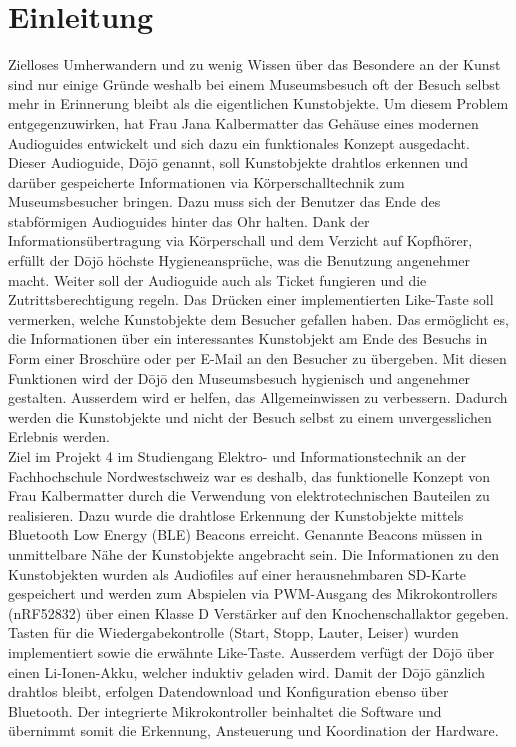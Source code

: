 \section{Einleitung}\label{sec:einleitung}
Zielloses Umherwandern und zu wenig Wissen über das Besondere an der Kunst sind nur einige Gründe weshalb bei einem Museumsbesuch oft der Besuch selbst mehr in Erinnerung bleibt als die eigentlichen Kunstobjekte. Um diesem Problem entgegenzuwirken, hat Frau Jana Kalbermatter das Gehäuse eines modernen Audioguides entwickelt und sich dazu ein funktionales Konzept ausgedacht. Dieser Audioguide, Dōjō genannt, soll Kunstobjekte drahtlos erkennen und darüber gespeicherte Informationen via Körperschalltechnik zum Museumsbesucher bringen. Dazu muss sich der Benutzer das Ende des stabförmigen Audioguides hinter das Ohr halten. Dank der Informationsübertragung via Körperschall und dem Verzicht auf Kopfhörer, erfüllt der Dōjō höchste Hygieneansprüche, was die Benutzung angenehmer macht. Weiter soll der Audioguide auch als Ticket fungieren und die Zutrittsberechtigung regeln. Das Drücken einer implementierten \glqq Like\grqq-Taste soll vermerken, welche Kunstobjekte dem Besucher gefallen haben. Das ermöglicht es, die Informationen über ein interessantes Kunstobjekt am Ende des Besuchs in Form einer Broschüre oder per E-Mail an den Besucher zu übergeben. Mit diesen Funktionen wird der Dōjō den Museumsbesuch hygienisch und angenehmer gestalten. Ausserdem wird er helfen, das Allgemeinwissen zu verbessern. Dadurch werden die Kunstobjekte und nicht der Besuch selbst zu einem unvergesslichen Erlebnis werden.\\
Ziel im Projekt 4 im Studiengang Elektro- und Informationstechnik an der Fachhochschule Nordwestschweiz war es deshalb, das funktionelle Konzept von Frau Kalbermatter durch die Verwendung von elektrotechnischen Bauteilen zu realisieren. Dazu wurde die drahtlose Erkennung der Kunstobjekte mittels Bluetooth Low Energy (BLE) Beacons erreicht. Genannte Beacons müssen in unmittelbare Nähe der Kunstobjekte angebracht sein. Die Informationen zu den Kunstobjekten wurden als Audiofiles auf einer herausnehmbaren SD-Karte gespeichert und werden zum Abspielen via PWM-Ausgang des Mikrokontrollers (nRF52832) über einen Klasse D Verstärker auf den Knochenschallaktor gegeben. Tasten für die Wiedergabekontrolle (Start, Stopp, Lauter, Leiser) wurden implementiert sowie die erwähnte \glqq Like\grqq -Taste. Ausserdem verfügt der Dōjō über einen Li-Ionen-Akku, welcher induktiv geladen wird. Damit der Dōjō gänzlich drahtlos bleibt, erfolgen Datendownload und Konfiguration ebenso über Bluetooth. Der integrierte Mikrokontroller beinhaltet die Software und übernimmt somit die Erkennung, Ansteuerung und Koordination der Hardware.\\
